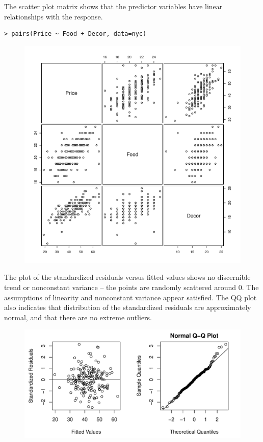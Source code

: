 \documentclass[10pt]{beamer}\usepackage[]{graphicx}\usepackage[]{color}
\begin{document}
\begin{frame}[fragile]
The scatter plot matrix shows that the predictor variables have linear relationships with the response.
\small
\begin{verbatim}
> pairs(Price ~ Food + Decor, data=nyc)
\end{verbatim}
\begin{figure}
\includegraphics[scale=0.35]{figure/menu_pairs.pdf}
\end{figure}
\end{frame}

\begin{frame}
\small
The plot of the standardized residuals versus fitted values shows no discernible trend or nonconstant variance -- the points are randomly scattered around 0. The assumptions of linearity and nonconstant variance appear satisfied.  The QQ plot also indicates that distribution of the standardized residuals are approximately normal, and that there are no extreme outliers.
\begin{figure}
\includegraphics[scale=0.5]{figure/resid_fitted.pdf}
\end{figure}
\end{frame}
\end{document}
